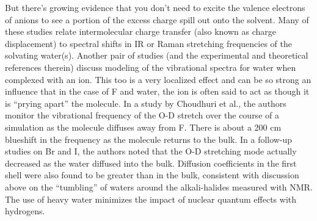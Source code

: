 \begin{intro}
   But there's growing evidence that you don't need to excite the valence electrons of anions to see a portion of the excess charge spill out onto the 
   solvent\cite{angelina2013cov,attah2015structure,cordoba2011ctinhbonds,hynes2000cthalides,hynes2008ctnitrate,kim1999bigf,kim2000smallall,kim2002bigall,klein2005solutesolventct,lee2012ctice,mccoy2006prywaterf,mo2006polctqmmm,patel2010polarizability,rogers2010ctpolar,soniat2012ct,sarkar2013cthalideohraman,soniat2014ct_surf,rick2016polct}.
   Many of these studies relate intermolecular charge transfer (also known as charge displacement) to spectral shifts in IR or Raman stretching frequencies of the solvating water(s)\cite{xiong2010lowest}. 
   Another pair of studies (and the experimental and theoretical references therein) discuss modeling of the vibrational spectra for water when complexed with an 
   ion\cite{kamarchik2010quantum,puniyan2016theoretical}. This too is a very localized effect and can be so strong an influence that in the case of F\sur{-} and water, the ion is 
   often said to act as though it is ``prying apart'' the molecule\cite{collins2007review,mccoy2006prywaterf}. In a study by Choudhuri et al., the authors monitor the vibrational 
   frequency of the O-D stretch over the course of a simulation as the molecule diffuses away from F\sur{-}\cite{choudhuri2012first}. There is about a 200 cm blueshift
   in the frequency as the molecule returns to the bulk. In a follow-up studies on Br\sur{-} and I\sur{-}, the authors noted that the O-D stretching mode actually decreased as the water
   diffused into the bulk\cite{karmakar2013first,karmakar2015water}. Diffusion coefficients in the first shell were also found to be greater than in the bulk, consistent with discussion
   above on the ``tumbling'' of waters around the alkali-halides measured with NMR\cite{karmakar2015water}. The use of heavy water minimizes the impact of nuclear quantum effects with 
   hydrogens.
   

\end{intro}
